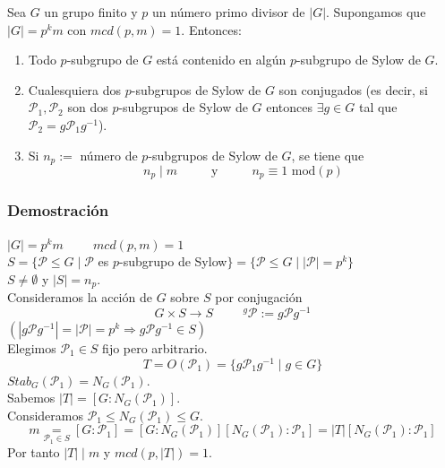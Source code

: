 \documentclass[11pt,a4paper]{article}
\begin{document}
Sea $G$ un grupo finito y $p$ un número primo divisor de $|G|$. Supongamos que $|G| = p^{k}m$ con $mcd(p, m) = 1$. Entonces:
\begin{enumerate}[label = (\alph*)]
\item Todo $p$-subgrupo de $G$ está contenido en algún $p$-subgrupo de Sylow de $G$.
\item Cualesquiera dos $p$-subgrupos de Sylow de $G$ son conjugados (es decir, si $\mathcal{P}_{1}, \mathcal{P}_{2}$ son dos $p$-subgrupos de Sylow de $G$ entonces $\exists g \in G$ tal que $\mathcal{P}_{2} = g \mathcal{P}_{1} g^{-1}$).
\item Si $n_{p} :=$ número de $p$-subgrupos de Sylow de $G$, se tiene que
$$n_{p} \mid m \hspace{1cm} \text{ y } \hspace{1cm} n_{p} \equiv 1 \text{ mod}(p)$$
\end{enumerate}

\subsubsection*{Demostración}

$|G| = p^{k}m \hspace{1cm} mcd(p, m) = 1$ \\
$S = \{\mathcal{P} \leqslant G \mid \mathcal{P}$ es $p$-subgrupo de Sylow$\} = \{\mathcal{P} \leqslant G \mid |\mathcal{P}| = p^{k}\}$ \\
$S \neq \emptyset$ y $|S| = n_{p}$. \\
Consideramos la acción de $G$ sobre $S$ por conjugación
$$G \times S \to S \hspace{1cm} ^{g}\mathcal{P} := g \mathcal{P} g^{-1}$$
$(|g \mathcal{P} g^{-1}| = |\mathcal{P}| = p^{k} \Rightarrow g \mathcal{P} g^{-1} \in S)$ \\
Elegimos $\mathcal{P}_{1} \in S$ fijo pero arbitrario.
$$T = O(\mathcal{P}_{1}) = \{g \mathcal{P}_{1} g^{-1} \mid g \in G\}$$
$Stab_{G}(\mathcal{P}_{1}) = N_{G}(\mathcal{P}_{1})$. \\
Sabemos $|T| = [G : N_{G}(\mathcal{P}_{1})]$. \\
Consideramos $\mathcal{P}_{1} \leqslant N_{G}(\mathcal{P}_{1}) \leqslant G$.
$$m \underset{\mathcal{P}_{1} \in S}{=} [G : \mathcal{P}_{1}] = [G : N_{G}(\mathcal{P}_{1})] [N_{G}(\mathcal{P}_{1}):\mathcal{P}_{1}] = |T|[N_{G}(\mathcal{P}_{1}):\mathcal{P}_{1}]$$
Por tanto $|T| \mid m$ y $mcd(p, |T|) = 1$.
\end{document}
